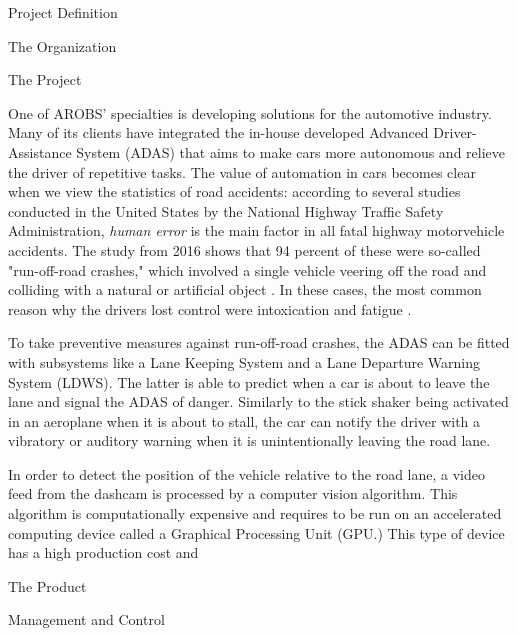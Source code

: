 \documentclass{matthijs}
\begin{document}
\begin{hoofdstuk}{Project Definition}
\begin{paragraaf}{The Organization}
		\end{paragraaf}

		\begin{paragraaf}{The Project}

			One of AROBS' specialties is developing solutions for the automotive industry.
			Many of its clients have integrated the in-house developed Advanced Driver-Assistance System (ADAS) that aims to make cars more autonomous and relieve the driver of repetitive tasks.
			The value of automation in cars becomes clear when we view the statistics of road accidents: according to several studies \cite{nhtsa2017fatal} \cite{liu2009factors} \cite{dod2011run} conducted in the United States by the National Highway Traffic Safety Administration, \textit{human error} is the main factor in all fatal highway motorvehicle accidents.
			The study from 2016 shows that 94 percent of these were so-called "run-off-road crashes," which involved a single vehicle veering off the road and colliding with a natural or artificial object \cite{nhtsa2017fatal}.
			In these cases, the most common reason why the drivers lost control were intoxication and fatigue \cite{nhtsa2017fatal}.
			
			To take preventive measures against run-off-road crashes, the ADAS can be fitted with subsystems like a Lane Keeping System and a Lane Departure Warning System (LDWS).
			The latter is able to predict when a car is about to leave the lane and signal the ADAS of danger.
			Similarly to the stick shaker being activated in an aeroplane when it is about to stall, the car can notify the driver with a vibratory or auditory warning when it is unintentionally leaving the road lane.

			In order to detect the position of the vehicle relative to the road lane, a video feed from the dashcam is processed by a computer vision algorithm.
			This algorithm is computationally expensive and requires to be run on an accelerated computing device called a Graphical Processing Unit (GPU.)
			This type of device has a high production cost and 

		\end{paragraaf}

	\end{hoofdstuk}
	
	\begin{hoofdstuk}{The Product}

	\end{hoofdstuk}
	
	\begin{hoofdstuk}{Management and Control}

	\end{hoofdstuk}
	
\end{document}
